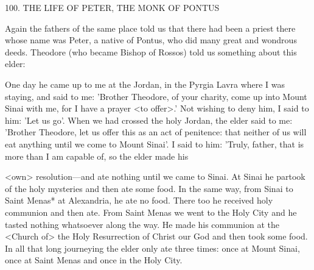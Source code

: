 100. THE LIFE OF PETER, THE MONK OF PONTUS

Again the fathers of the same place told us that there had been a
priest there whose name was Peter, a native of Pontus, who did
many great and wondrous deeds. Theodore (who became Bishop of
Rossos) told us something about this elder:

One day he came up to me at the Jordan, in the Pyrgia Lavra where
I was staying, and said to me: 'Brother Theodore, of your charity,
come up into Mount Sinai with me, for I have a prayer <to offer>.'
Not wishing to deny him, I said to him: 'Let us go'. When we had
crossed the holy Jordan, the elder said to me: 'Brother Theodore, let
us offer this as an act of penitence: that neither of us will eat
anything until we come to Mount Sinai'. I said to him: 'Truly,
father, that is more than I am capable of, so the elder made his

<own> resolution—and ate nothing until we came to Sinai. At Sinai
he partook of the holy mysteries and then ate some food. In the
same way, from Sinai to Saint Menas* at Alexandria, he ate no
food. There too he received holy communion and then ate. From
Saint Menas we went to the Holy City and he tasted nothing
whatsoever along the way. He made his communion at the <Church
of> the Holy Resurrection of Christ our God and then took some
food. In all that long journeying the elder only ate three times: once
at Mount Sinai, once at Saint Menas and once in the Holy City.

